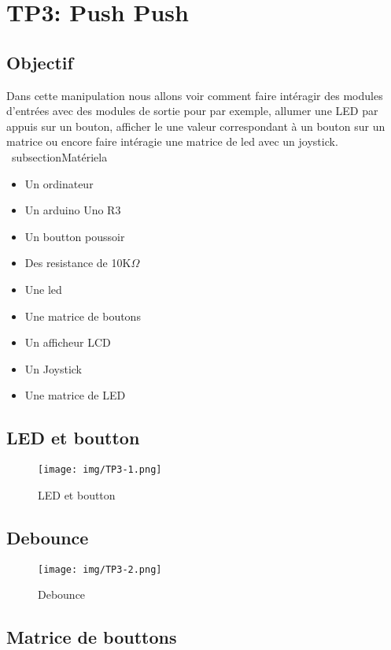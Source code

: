 \section{TP3: Push Push}
\subsection{Objectif}
Dans cette manipulation nous allons voir comment faire intéragir des modules d'entrées avec des modules de sortie pour par exemple, allumer une LED par appuis sur un bouton, afficher le une valeur correspondant à un bouton sur un matrice ou encore faire intéragie une matrice de led avec un joystick.
\
subsection{Matériel}a
\begin{itemize}
	\item Un ordinateur
	\item Un arduino Uno R3
	\item Un boutton poussoir
	\item Des resistance de 10K$\Omega$
	\item Une led
	\item Une matrice de boutons
	\item Un afficheur LCD
	\item Un Joystick
	\item Une matrice de LED
\end{itemize}


\subsection{LED et boutton}


\begin{figure}[H]
	\centering
	\texttt{[image: img/TP3-1.png]}
	\caption{\label{TP3.1}LED et boutton}
\end{figure}

\subsection{Debounce}


\begin{figure}[H]
	\centering
	\texttt{[image: img/TP3-2.png]}
	\caption{\label{TP3.2}Debounce}
\end{figure}
\subsection{Matrice de bouttons}

